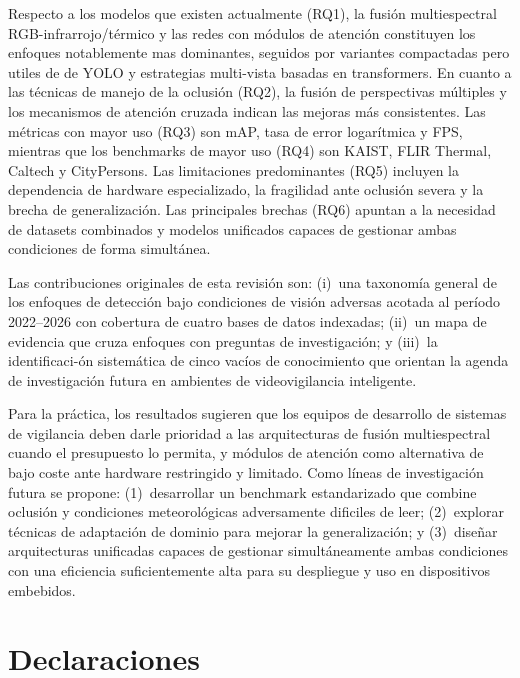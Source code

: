 \documentclass[12pt, a4paper]{article}
\begin{document}
Respecto a los modelos que existen actualmente (RQ1), la fusi\'{o}n multiespectral
RGB-infrarrojo/\allowbreak t\'{e}rmico y las redes con m\'{o}dulos de atenci\'{o}n
constituyen los enfoques notablemente mas dominantes, seguidos por variantes compactadas pero utiles de
de YOLO y estrategias multi-vista basadas en transformers. En cuanto a
las t\'{e}cnicas de manejo de la oclusi\'{o}n (RQ2), la fusi\'{o}n de
perspectivas m\'{u}ltiples y los mecanismos de atenci\'{o}n cruzada
indican las mejoras m\'{a}s consistentes. Las m\'{e}tricas con mayor
uso (RQ3) son mAP, tasa de error logar\'{i}tmica y FPS, mientras
que los benchmarks de mayor uso (RQ4) son KAIST, FLIR Thermal, Caltech
y CityPersons. Las limitaciones predominantes (RQ5) incluyen la
dependencia de hardware especializado, la fragilidad ante oclusi\'{o}n
severa y la brecha de generalizaci\'{o}n. Las principales brechas (RQ6)
apuntan a la necesidad de datasets combinados y modelos unificados
capaces de gestionar ambas condiciones de forma simult\'{a}nea.

Las contribuciones originales de esta revisi\'{o}n son: (i)~una
taxonom\'{i}a general de los enfoques de detecci\'{o}n bajo condiciones de
visi\'{o}n adversas acotada al per\'{i}odo 2022--2026 con cobertura
de cuatro bases de datos indexadas; (ii)~un mapa de evidencia que
cruza enfoques con preguntas de investigaci\'{o}n; y (iii)~la
iden\-ti\-fi\-ca\-ci-\'{o}n sistem\'{a}tica de cinco vac\'{i}os de conocimiento
que orientan la agenda de investigaci\'{o}n futura en ambientes de
videovigilancia inteligente.

Para la pr\'{a}ctica, los resultados sugieren que los equipos de
desarrollo de sistemas de vigilancia deben darle prioridad a las arquitecturas de
fusi\'{o}n multiespectral cuando el presupuesto lo permita, y
m\'{o}dulos de atenci\'{o}n como alternativa de bajo coste ante
hardware restringido y limitado. Como l\'{i}neas de investigaci\'{o}n futura se
propone: (1)~desarrollar un benchmark estandarizado que combine
oclusi\'{o}n y condiciones meteorol\'{o}gicas adversamente dificiles de leer; (2)~explorar
t\'{e}cnicas de adaptaci\'{o}n de dominio para mejorar la
generalizaci\'{o}n; y (3)~dise\~{n}ar arquitecturas unificadas capaces
de gestionar simult\'{a}neamente ambas condiciones con una eficiencia
suficientemente alta para su despliegue y uso en dispositivos embebidos.

\section*{Declaraciones}
\end{document}
